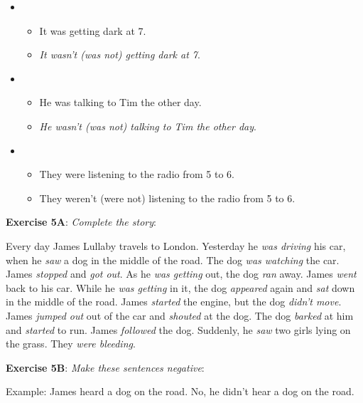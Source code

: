 \begin{itemize}
\item
\begin{itemize}
\item It was getting dark at 7.
\item \textit{It wasn't (was not) getting dark at 7}.
\end{itemize}

\item
\begin{itemize}
\item He was talking to Tim the other day.
\item \textit{He wasn't (was not) talking to Tim the other day}.
\end{itemize}

\item
\begin{itemize}
\item They were listening to the radio from 5 to 6.
\item They weren't (were not) listening to the radio from 5 to 6.
\end{itemize}

\end{itemize}

\textbf{Exercise 5A}: \textit{Complete the story}:

Every day James Lullaby travels to London. Yesterday he \textit{was driving} his car, when he \textit{saw} a dog in the middle of the road. The dog \textit{was watching} the car. James \textit{stopped} and \textit{got out}. As he \textit{was getting} out, the dog \textit{ran} away. James \textit{went} back to his car. While he \textit{was getting} in it, the dog \textit{appeared} again and \textit{sat} down in the middle of the road. James \textit{started} the engine, but the dog \textit{didn't move}. James \textit{jumped out} out of the car and \textit{shouted} at the dog. The dog \textit{barked} at him and \textit{started} to run. James \textit{followed} the dog. Suddenly, he \textit{saw} two girls lying on the grass. They \textit{were bleeding}.

\textbf{Exercise 5B}: \textit{Make these sentences negative}:

Example:
James heard a dog on the road.
No, he didn't hear a dog on the road.

